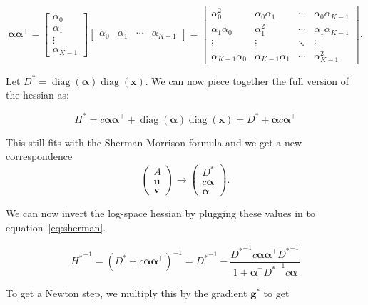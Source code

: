 \documentclass[twoside]{article}
\begin{document}
\[
\boldsymbol{\alpha} \boldsymbol{\alpha}^\top =
\begin{bmatrix}
    \alpha_0 \\
    \alpha_1 \\
    \vdots \\
    \alpha_{K-1}
\end{bmatrix}
\begin{bmatrix}
    \alpha_0 & \alpha_1 & \cdots & \alpha_{K-1}
\end{bmatrix} =
\begin{bmatrix}
    \alpha_0^2 & \alpha_0\alpha_1 & \cdots & \alpha_0\alpha_{K-1} \\
    \alpha_1\alpha_0 & \alpha_1^2 & \cdots & \alpha_1\alpha_{K-1} \\
    \vdots & \vdots & \ddots & \vdots \\
    \alpha_{K-1}\alpha_0 & \alpha_{K-1}\alpha_1 & \cdots & \alpha_{K-1}^2
\end{bmatrix}.
\]

Let ${D^*} = \operatorname{diag}(\boldsymbol{\alpha})\operatorname{diag}(\boldsymbol{x})$. We can now piece together the full version of the hessian as:

\[
H^* = c \boldsymbol{\alpha} \boldsymbol{\alpha}^\top + \operatorname{diag}(\boldsymbol{\alpha})\operatorname{diag}(\boldsymbol{x}) = D^* + \boldsymbol{\alpha} c \boldsymbol{\alpha}^\top
\]

This still fits with the Sherman-Morrison formula and we get a new correspondence
\[
    \begin{pmatrix}
        A \\
        \boldsymbol{u} \\
        \boldsymbol{v}
    \end{pmatrix}
    \rightarrow
    \begin{pmatrix}
        D^* \\
        c \boldsymbol{\alpha} \\
        \boldsymbol{\alpha}
    \end{pmatrix}.
\]

We can now invert the log-space hessian by plugging these values in to equation~\ref{eq:sherman}. 

\[
{H^*}^{-1} = \left(D^* +  c \boldsymbol{\alpha} \boldsymbol{\alpha}^\top\right)^{-1} = {D^*}^{-1} - \frac{{D^*}^{-1}c \boldsymbol{\alpha} \boldsymbol{\alpha}^{\top}{D^*}^{-1}}{1 + \boldsymbol{\alpha}^{\top}{D^*}^{-1}c \boldsymbol{\alpha} }
\]

To get a Newton step, we multiply this by the gradient \(\boldsymbol{g}^*\) to get
\end{document}

